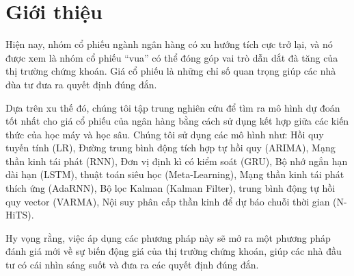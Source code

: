 \section{Giới thiệu}
\label{sec:introduction}
Hiện nay, nhóm cổ phiếu ngành ngân hàng có xu hướng tích cực trở lại, và nó được xem là nhóm cổ phiếu “vua” có thể đóng góp vai trò dẫn dắt đà tăng của thị trường chứng khoán. Giá cổ phiếu là những chỉ số quan trọng giúp các nhà đùa tư đưa ra quyết định đúng đắn.
\par
Dựa trên xu thế đó, chúng tôi tập trung nghiên cứu để tìm ra mô hình dự đoán tốt nhất cho giá cổ phiếu của ngân hàng bằng cách sử dụng kết hợp giữa các kiến thức của học máy và học sâu. Chúng tôi sử dụng các mô hình như: Hồi quy tuyến tính (LR), Đường trung bình động tích hợp tự hồi quy (ARIMA), Mạng thần kinh tái phát (RNN), Đơn vị định kì có kiểm soát (GRU), Bộ nhớ ngắn hạn dài hạn (LSTM), thuật toán siêu học (Meta-Learning), Mạng thần kinh tái phát thích ứng (AdaRNN), Bộ lọc Kalman (Kalman Filter), trung bình động tự hồi quy vector (VARMA), Nội suy phân cấp thần kinh để dự báo chuỗi thời gian (N-HiTS).
\par
Hy vọng rằng, việc áp dụng các phương pháp này sẽ mở ra một phương pháp đánh giá mới về sự biến động giá của thị trường chứng khoán, giúp các nhà đầu tư có cái nhìn sáng suốt và đưa ra các quyết định đúng đắn.

